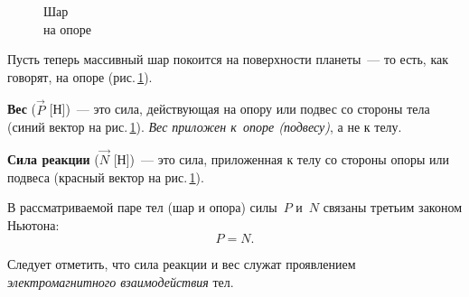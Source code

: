 \documentclass[main.tex]{subfiles}
\begin{document}
{%
\setlength\intextsep{0pt}
\begin{figure}
    \centering
    \caption{Шар\\ на опоре}
    \label{fig:p36}
\end{figure}












Пусть теперь массивный шар покоится на поверхности планеты~--- то есть, как говорят, на опоре (рис.\,\ref{fig:p36}).

\textbf{Вес} ($\vec P$ [Н])~--- это сила, действующая на
опору или подвес со стороны тела (синий вектор на рис.\,\ref{fig:p36}). \emph{Вес приложен к~опоре (подвесу)}, а не к телу.

\textbf{Сила реакции} ($\vec N$ [Н])~--- это сила, приложенная к телу со стороны опоры или подвеса (красный вектор на рис.\,\ref{fig:p36}).

В рассматриваемой паре тел (шар и опора) силы~$P$ и~$N$ связаны третьим законом Ньютона:
\begin{equation}
    P=N.
\end{equation}

}

Следует отметить, что сила реакции и вес служат проявлением \emph{электромагнитного взаимодействия} тел.






 
\end{document}
